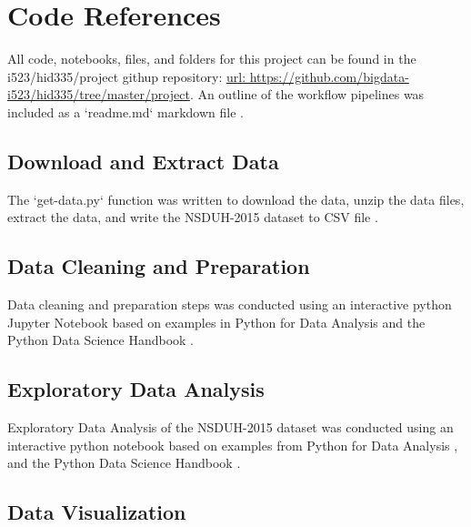 \documentclass[sigconf]{acmart}
\begin{document}

 


\appendix

\section{Code References}
All code, notebooks, files, and folders for this project can be found in the
i523/hid335/project githup repository: 
\url{url:  https://github.com/bigdata-i523/hid335/tree/master/project}.
An outline of the workflow pipelines was included as a `readme.md` markdown
file \cite{pipeline17}.

\subsection{Download and Extract Data}

The `get-data.py` function was written to download the data, unzip the data
files, extract the data, and write the NSDUH-2015 dataset to CSV file 
\cite{getdata17}.

\subsection{Data Cleaning and Preparation}

Data cleaning and preparation steps was conducted using an interactive python 
Jupyter Notebook \cite{data17} based on examples in Python for Data Analysis 
\cite{mckinney17} and the Python Data Science Handbook \cite{vanderplas17}.

\subsection{Exploratory Data Analysis}

Exploratory Data Analysis of the NSDUH-2015 dataset was conducted using an 
interactive python notebook \cite{eda17} based on examples from Python for 
Data Analysis \cite{mckinney17}, and the Python Data Science Handbook 
\cite{vanderplas17}.  

\subsection{Data Visualization}
\end{document}
